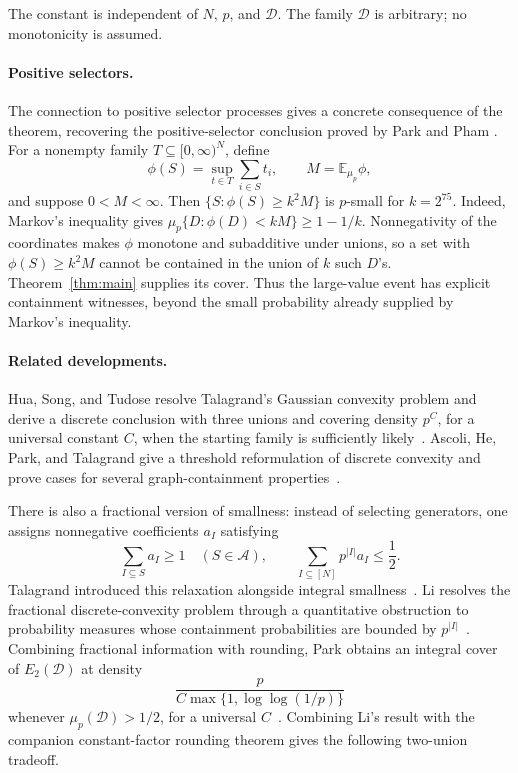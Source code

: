 The constant is independent of $N$, $p$, and $\mathcal D$.
The family $\mathcal D$ is arbitrary; no monotonicity is assumed.

\paragraph{Positive selectors.}
The connection to positive selector processes
\cite[Section~7]{Talagrand10}
gives a concrete consequence of the theorem, recovering the
positive-selector conclusion proved by Park and Pham
\cite[Theorem~1.2]{ParkPham24}. For a nonempty family
$T\subseteq[0,\infty)^N$, define
\[
\phi(S)=\sup_{t\in T}\sum_{i\in S}t_i,
\qquad M=\mathbb E_{\mu_p}\phi,
\]
and suppose $0<M<\infty$. Then
$\{S:\phi(S)\ge k^2M\}$ is $p$-small for $k=2^{75}$.
Indeed, Markov's inequality gives
$\mu_p\{D:\phi(D)<kM\}\ge1-1/k$.
Nonnegativity of the coordinates makes $\phi$ monotone and subadditive
under unions, so a set with $\phi(S)\ge k^2M$ cannot be contained in
the union of $k$ such $D$'s. Theorem~\ref{thm:main} supplies its cover.
Thus the large-value event has explicit containment witnesses, beyond
the small probability already supplied by Markov's inequality.

\paragraph{Related developments.}
Hua, Song, and Tudose resolve Talagrand's Gaussian convexity problem and
derive a discrete conclusion with three unions and covering density
$p^C$, for a universal constant $C$, when the starting family is
sufficiently likely~\cite[Corollaries~1.3--1.4]{HuaSongTudose26}.
Ascoli, He, Park, and Talagrand give a threshold reformulation of discrete
convexity and prove cases for several graph-containment
properties~\cite[Proposition~1.5 and Theorems~1.10--1.13]{AscoliEtAl26}.

There is also a fractional version of smallness: instead of selecting
generators, one assigns nonnegative coefficients $a_I$ satisfying
\[
\sum_{I\subseteq S}a_I\ge1\quad(S\in\mathcal A),
\qquad
\sum_{I\subseteq[N]}p^{|I|}a_I\le\frac12.
\]
Talagrand introduced this relaxation alongside integral
smallness~\cite[Sections~6 and~7]{Talagrand10}.
Li resolves the fractional discrete-convexity problem through a quantitative
obstruction to probability measures whose containment probabilities
are bounded by $p^{|I|}$~\cite[Theorem~1.9]{Li26}.
Combining fractional information with rounding, Park obtains an integral
cover of $E_2(\mathcal D)$ at density
\[
\frac{p}{C\max\{1,\log\log(1/p)\}}
\]
whenever $\mu_p(\mathcal D)>1/2$, for a universal
$C$~\cite[Corollary~3.5]{Park26}.
Combining Li's result with the companion constant-factor rounding theorem
gives the following two-union tradeoff.

